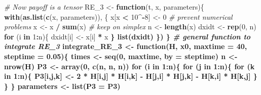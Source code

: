 \documentclass[]{book}
\newenvironment{Shaded}{\begin{snugshade}}{\end{snugshade}}
\newcommand{\CommentTok}[1]{\textcolor[rgb]{0.56,0.35,0.01}{\textit{#1}}}
\newcommand{\ControlFlowTok}[1]{\textcolor[rgb]{0.13,0.29,0.53}{\textbf{#1}}}
\newcommand{\DataTypeTok}[1]{\textcolor[rgb]{0.13,0.29,0.53}{#1}}
\newcommand{\DecValTok}[1]{\textcolor[rgb]{0.00,0.00,0.81}{#1}}
\newcommand{\FloatTok}[1]{\textcolor[rgb]{0.00,0.00,0.81}{#1}}
\newcommand{\KeywordTok}[1]{\textcolor[rgb]{0.13,0.29,0.53}{\textbf{#1}}}
\newcommand{\NormalTok}[1]{#1}
\newcommand{\OperatorTok}[1]{\textcolor[rgb]{0.81,0.36,0.00}{\textbf{#1}}}
\newcommand{\StringTok}[1]{\textcolor[rgb]{0.31,0.60,0.02}{#1}}
\begin{document}
\begin{Shaded}
\begin{Highlighting}[]
\CommentTok{# Now payoff is a tensor}
\NormalTok{RE_}\DecValTok{3}\NormalTok{ <-}\StringTok{ }\ControlFlowTok{function}\NormalTok{(t, x, parameters)\{}
  \KeywordTok{with}\NormalTok{(}\KeywordTok{as.list}\NormalTok{(}\KeywordTok{c}\NormalTok{(x, parameters)), \{}
\NormalTok{    x[x }\OperatorTok{<}\StringTok{ }\DecValTok{10}\OperatorTok{^-}\DecValTok{8}\NormalTok{] <-}\StringTok{ }\DecValTok{0} \CommentTok{# prevent numerical problems}
\NormalTok{    x <-}\StringTok{ }\NormalTok{x }\OperatorTok{/}\StringTok{ }\KeywordTok{sum}\NormalTok{(x) }\CommentTok{# keep on simplex}
\NormalTok{    n <-}\StringTok{ }\KeywordTok{length}\NormalTok{(x)}
\NormalTok{    dxidt <-}\StringTok{ }\KeywordTok{rep}\NormalTok{(}\DecValTok{0}\NormalTok{, n)}
    \ControlFlowTok{for}\NormalTok{ (i }\ControlFlowTok{in} \DecValTok{1}\OperatorTok{:}\NormalTok{n)\{}
\NormalTok{      dxidt[i] <-}\StringTok{ }\NormalTok{x[i] }\OperatorTok{*}\StringTok{ }\NormalTok{x }\OperatorTok{%
\NormalTok{    \}}
    \KeywordTok{list}\NormalTok{(dxidt)}
\NormalTok{  \})}
\NormalTok{\}}
\CommentTok{# general function to integrate RE_3}
\NormalTok{integrate_RE_}\DecValTok{3}\NormalTok{ <-}\StringTok{ }\ControlFlowTok{function}\NormalTok{(H, x0, }\DataTypeTok{maxtime =} \DecValTok{40}\NormalTok{, }\DataTypeTok{steptime =} \FloatTok{0.05}\NormalTok{)\{}
\NormalTok{  times <-}\StringTok{ }\KeywordTok{seq}\NormalTok{(}\DecValTok{0}\NormalTok{, maxtime, }\DataTypeTok{by =}\NormalTok{ steptime)}
\NormalTok{  n <-}\StringTok{ }\KeywordTok{nrow}\NormalTok{(H)}
\NormalTok{  P3 <-}\StringTok{ }\KeywordTok{array}\NormalTok{(}\DecValTok{0}\NormalTok{, }\KeywordTok{c}\NormalTok{(n, n, n))}
  \ControlFlowTok{for}\NormalTok{ (i }\ControlFlowTok{in} \DecValTok{1}\OperatorTok{:}\NormalTok{n)\{}
    \ControlFlowTok{for}\NormalTok{ (j }\ControlFlowTok{in} \DecValTok{1}\OperatorTok{:}\NormalTok{n)\{}
      \ControlFlowTok{for}\NormalTok{ (k }\ControlFlowTok{in} \DecValTok{1}\OperatorTok{:}\NormalTok{n)\{}
\NormalTok{        P3[i,j,k] <-}\StringTok{ }\DecValTok{2} \OperatorTok{*}\StringTok{ }\NormalTok{H[i,j] }\OperatorTok{*}\StringTok{ }\NormalTok{H[i,k] }\OperatorTok{-}\StringTok{  }\NormalTok{H[j,i] }\OperatorTok{*}\StringTok{ }\NormalTok{H[j,k] }\OperatorTok{-}\StringTok{ }\NormalTok{H[k,i] }\OperatorTok{*}\StringTok{ }\NormalTok{H[k,j]}
\NormalTok{      \}}
\NormalTok{    \}}
\NormalTok{  \}}
\NormalTok{  parameters <-}\StringTok{ }\KeywordTok{list}\NormalTok{(}\DataTypeTok{P3 =}\NormalTok{ P3)}
}
\end{Highlighting}
\end{Shaded}
\end{document}
